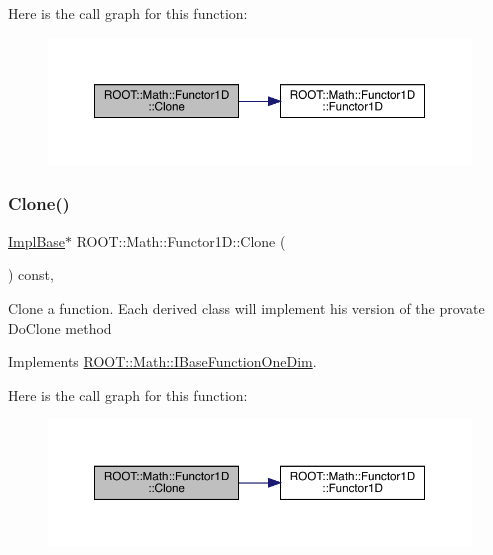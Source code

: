 Here is the call graph for this function\+:
\nopagebreak
\begin{figure}[H]
\begin{center}
\leavevmode
\includegraphics[width=350pt]{dc/d6d/classROOT_1_1Math_1_1Functor1D_af77ece084fc56e41c06e32e0f78a88a9_cgraph}
\end{center}
\end{figure}
\mbox{\label{classROOT_1_1Math_1_1Functor1D_af77ece084fc56e41c06e32e0f78a88a9}} 
\subsubsection{\texorpdfstring{Clone()}{Clone()}\hspace{0.1cm}{\footnotesize\ttfamily [3/3]}}
{\footnotesize\ttfamily \mbox{\hyperlink{classROOT_1_1Math_1_1Functor1D_a1ade2017edb7db0cbaf9a27a864f4dd3}{Impl\+Base}}$\ast$ R\+O\+O\+T\+::\+Math\+::\+Functor1\+D\+::\+Clone (\begin{DoxyParamCaption}{ }\end{DoxyParamCaption}) const\hspace{0.3cm}{\ttfamily [inline]}, {\ttfamily [virtual]}}

Clone a function. Each derived class will implement his version of the provate Do\+Clone method 

Implements \mbox{\hyperlink{classROOT_1_1Math_1_1IBaseFunctionOneDim_a656dbb4dfc43e8d1566442bfb1a717fd}{R\+O\+O\+T\+::\+Math\+::\+I\+Base\+Function\+One\+Dim}}.

Here is the call graph for this function\+:
\nopagebreak
\begin{figure}[H]
\begin{center}
\leavevmode
\includegraphics[width=350pt]{dc/d6d/classROOT_1_1Math_1_1Functor1D_af77ece084fc56e41c06e32e0f78a88a9_cgraph}
\end{center}
\end{figure}
\mbox{\label{classROOT_1_1Math_1_1Functor1D_a723dff64cd3d4e53174624fa56f30a18}} 
